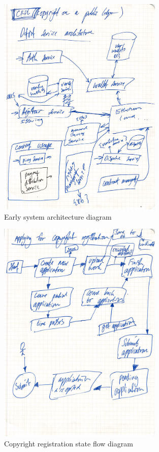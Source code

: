 \begin{figure}[H]
\caption{Early system architecture diagram}
\centering
\includegraphics[width=0.7\textwidth,height=\textheight,keepaspectratio]{images/appendix/design/docs/arch}
\end{figure}

\begin{figure}[H]
\caption{Copyright registration state flow diagram}
\centering
\includegraphics[width=0.7\textwidth,height=\textheight,keepaspectratio]{images/appendix/design/docs/reg}
\end{figure}

